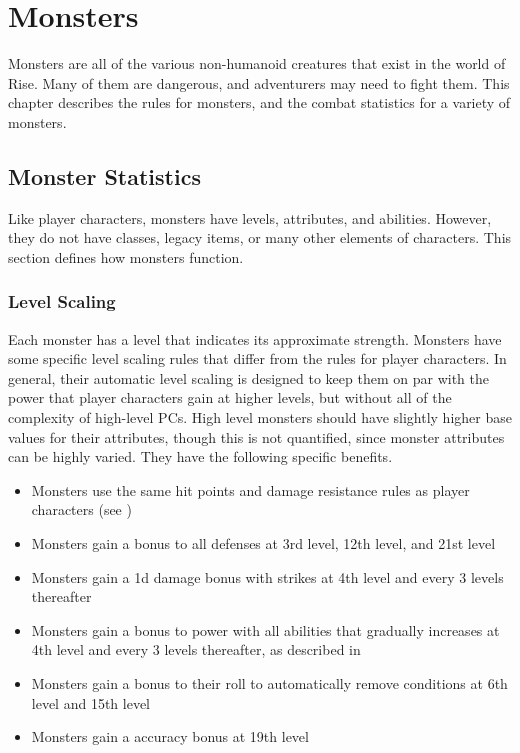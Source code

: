 \chapter{Monsters}

Monsters are all of the various non-humanoid creatures that exist in the world of Rise.
Many of them are dangerous, and adventurers may need to fight them.
This chapter describes the rules for monsters, and the combat statistics for a variety of monsters.

\section{Monster Statistics}
    Like player characters, monsters have levels, attributes, and abilities.
    However, they do not have classes, legacy items, or many other elements of characters.
    This section defines how monsters function.

    \subsection{Level Scaling}
        Each monster has a level that indicates its approximate strength.
        Monsters have some specific level scaling rules that differ from the rules for player characters.
        In general, their automatic level scaling is designed to keep them on par with the power that player characters gain at higher levels, but without all of the complexity of high-level PCs.
        High level monsters should have slightly higher base values for their attributes, though this is not quantified, since monster attributes can be highly varied.
        They have the following specific benefits.
        \begin{itemize}
            \item Monsters use the same hit points and damage resistance rules as player characters (see )
            \item Monsters gain a  bonus to all defenses at 3rd level, 12th level, and 21st level
            \item Monsters gain a \plus1d damage bonus with strikes at 4th level and every 3 levels thereafter
            \item Monsters gain a  bonus to power with all abilities that gradually increases at 4th level and every 3 levels thereafter, as described in 
            \item Monsters gain a  bonus to their roll to automatically remove conditions at 6th level and 15th level
            \item Monsters gain a  accuracy bonus at 19th level
        \end{itemize}

